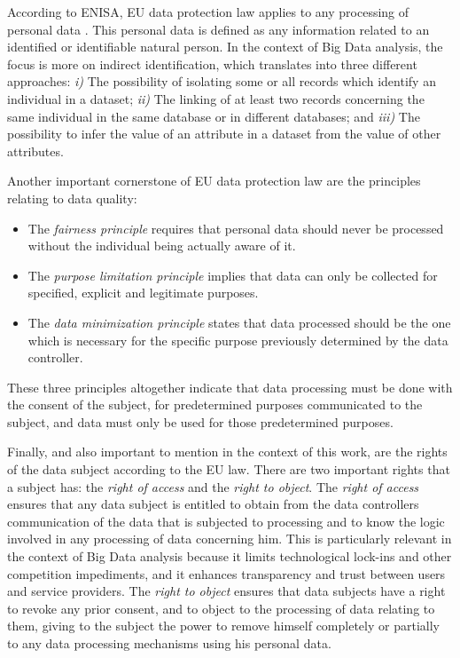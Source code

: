  According to \ac{ENISA}, \ac{EU} data protection law applies to any processing of personal data \cite{DAcquisto2015}. This personal data is defined as any information related to an identified or identifiable natural person. In the context of Big Data analysis, the focus is more on indirect identification, which translates into three different approaches: \emph{i)} The possibility of isolating some or all records which identify an individual in a dataset; \emph{ii)} The linking of at least two records concerning the same individual in the same database or in different databases; and  \emph{iii)} The possibility to infer the value of an attribute in a dataset from the value of other attributes.



Another important cornerstone of \ac{EU} data protection law are the principles relating to data quality:

\begin{itemize}
    \setlength\itemsep{1em}

    \item The \textit{fairness principle} requires that personal data should never be processed without the individual being actually aware of it.

    \item The \textit{purpose limitation principle} implies that data can only be collected for specified, explicit and legitimate purposes.

    \item The \textit{data minimization principle} states that data processed should be the one which is necessary for the specific purpose previously determined by the data controller.
\end{itemize}


These three principles altogether indicate that data processing must be done with the consent of the subject, for predetermined purposes communicated to the subject, and data must only be used for those predetermined purposes.

Finally, and also important to mention in the context of this work, are the rights of the data subject according to the \ac{EU} law. There are two important rights that a subject has: the \textit{right of access} and the \textit{right to object}.
The \textit{right of access} ensures that any data subject is entitled to obtain from the data controllers communication of the data that is subjected to processing and to know the logic involved in any processing of data concerning him.
This is particularly relevant in the context of Big Data analysis because it limits technological lock-ins and other competition impediments, and it enhances transparency and trust between users and service providers.
The \textit{right to object} ensures that data subjects have a right to revoke any prior consent, and to object to the processing of data relating to them, giving to the subject the power to remove himself completely or partially to any data processing mechanisms using his personal data.


